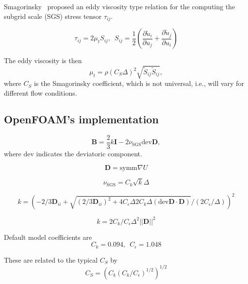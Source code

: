Smagorinsky~\cite{Smagorinsky1963} proposed an eddy viscosity type relation for
the computing the subgrid scale (SGS) stress tensor $\tau_{ij}$.

\begin{equation}
    \tau_{ij} = 2 \mu_t S_{ij}, \, \, \,
    S_{ij} = \frac{1}{2}
    \left(
    \frac{\partial \tilde{u}_i}{\partial u_j}
    + \frac{\partial \tilde{u}_j}{\partial u_i}
    \right)
\end{equation}

The eddy viscosity is then
\begin{equation}
    \mu_t = \rho (C_S \Delta)^2 \sqrt{\tilde{S}_{ij} \tilde{S}_{ij}},
\end{equation}
where $C_S$ is the Smagorinsky coefficient, which is not universal, i.e., will
vary for different flow conditions.


\subsection{OpenFOAM's implementation}


\begin{equation}
    \mathbf{B} = \frac{2}{3}k \mathbf{I}
    - 2 \nu_{\mathrm{SGS}} \mathrm{dev} \mathbf{D},
\end{equation}
where $\mathrm{dev}$ indicates the deviatoric component.

\begin{equation}
    \mathbf{D} = \mathrm{symm} \nabla U
\end{equation}

\begin{equation}
    \nu_{\mathrm{SGS}} = C_k \sqrt{k} \Delta
\end{equation}

\begin{equation}
    k =
    (
    -2/3 \mathbf{D}_{ii} + \sqrt{(2/3 \mathbf{D}_{ii})^2
    + 4C_\epsilon \Delta 2 C_k \Delta
    (\mathrm{dev} \mathbf{D} \cdot \mathbf{D})}
    / (2 C_\epsilon / \Delta)
    )^2
\end{equation}

\begin{equation}
    k = 2 C_k/C_\epsilon \Delta^2 ||\mathbf{D}||^2
\end{equation}

Default model coefficients are
\begin{equation}
    C_k = 0.094, \, \, \,
    C_\epsilon = 1.048
\end{equation}

These are related to the typical $C_S$ by
\begin{equation}
    C_S =
    \left(
        C_k \left(C_k / C_\epsilon \right)^{1/2}
    \right)^{1/2}
\end{equation}
